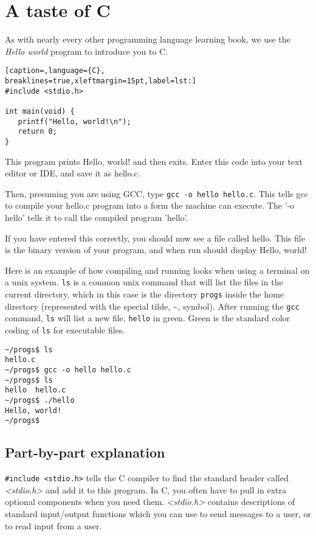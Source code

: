 \section{A taste of C}
As with nearly every other programming language learning book, we use the
\emph{Hello world} program to introduce you to C.

\lstset{basicstyle=\scriptsize, numbers=left, captionpos=b, tabsize=4}
\begin{lstlisting}[caption=,language={C},
breaklines=true,xleftmargin=15pt,label=lst:]
#include <stdio.h>

int main(void) {
   printf("Hello, world!\n");
   return 0;
}
\end{lstlisting}

This program prints Hello, world! and then exits.
Enter this code into your text editor or IDE, and save it as hello.c.

Then, presuming you are using GCC, type \texttt{gcc -o hello hello.c}. This
tells gcc to compile your hello.c program into a form the machine can execute.
The '-o hello' tells it to call the compiled program 'hello'.

If you have entered this correctly, you should now see a file called hello.
This file is the binary version of your program, and when run should display
Hello, world!

Here is an example of how compiling and running looks when using a terminal on
a unix system. \texttt{ls} is a common unix command that will list the files in
the current directory, which in this case is the directory \texttt{progs}
inside the home directory (represented with the special tilde, \~{}, symbol).
After running the \texttt{gcc} command, \texttt{ls} will list a new file,
\texttt{hello} in green. Green is the standard color coding of \texttt{ls} for
executable files. 

\begin{verbatim}
~/progs$ ls
hello.c
~/progs$ gcc -o hello hello.c
~/progs$ ls
hello  hello.c
~/progs$ ./hello
Hello, world!
~/progs$
\end{verbatim}

\subsection{Part-by-part explanation}
\texttt{\#include \textless{}stdio.h\textgreater{}} tells the C compiler to
find the standard header called \emph{\textless{stdio.h\textgreater{}}} and add
it to this program. In C, you often have to pull in extra optional components
when you need them. \emph{\textless{}stdio.h\textgreater{}} contains
descriptions of standard input/output functions which you can use to send
messages to a user, or to read input from a user.

